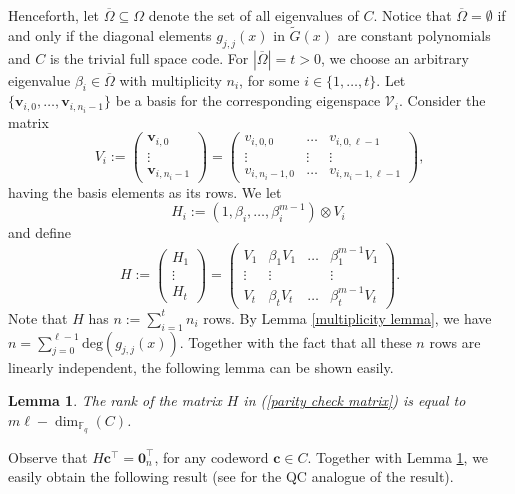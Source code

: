 \documentclass[11pt]{amsart}
\theoremstyle{plain}
\newtheorem{lem}[thm]{Lemma}
\theoremstyle{definition}
\numberwithin{equation}{section}
\newcommand{\Fq}{\mathbb{F}_{q}}
\begin{document}
Henceforth, let $\overline{\Omega}\subseteq \Omega$ denote the set of all eigenvalues of $C$. Notice that $\overline{\Omega}=\emptyset$ if and only if the diagonal elements $g_{j,j}(x)$ in $\widetilde{G}(x)$ are constant polynomials and $C$ is the trivial full space code. For $|\overline{\Omega}|=t>0$, we choose an arbitrary eigenvalue $\beta_i\in\overline{\Omega}$ with multiplicity $n_i$, for some $i \in\{1,\ldots,t\}$. Let $\{\mathbf{v}_{i,0},\ldots,\mathbf{v}_{i,n_i-1}\}$ be a basis for the corresponding eigenspace $\mathcal{V}_i$. Consider the matrix  
\begin{equation}\label{Eigenspace} 
V_i:=\begin{pmatrix}
\mathbf{v}_{i,0} \\
\vdots\\
\mathbf{v}_{i,n_i-1} 
 \end{pmatrix}=\begin{pmatrix}
v_{i,0,0}&\ldots&v_{i,0,\ell-1} \\
\vdots &\vdots & \vdots\\
v_{i,n_i-1,0}&\ldots&v_{i,n_i-1,\ell-1}
 \end{pmatrix},
\end{equation} 
having the basis elements as its rows. We let
\[ H_i:=(1, \beta_i,\ldots,\beta_i^{m-1})\otimes V_i\ \]
and define
\begin{equation}\label{parity check matrix} 
H:=\begin{pmatrix}
H_1 \\
\vdots\\
H_t 
\end{pmatrix}=\begin{pmatrix}
V_1&\beta_1V_1&\ldots&\beta_1^{m-1}V_1 \\
\vdots &\vdots & & \vdots\\
V_t&\beta_tV_t&\ldots&\beta_t^{m-1}V_t
\end{pmatrix}.
\end{equation} 
Note that $H$ has $n:=\sum_{i=1}^t n_i$ rows. By Lemma \ref{multiplicity lemma}, we have $n=\sum_{j=0}^{\ell-1}\mbox{deg}(g_{j,j}(x))$. Together with the fact that all these $n$ rows are linearly independent, the following lemma can be shown easily.
\begin{lem}\cite[Lemma 2]{ST}\label{rank lemma}
The rank of the matrix $H$ in (\ref{parity check matrix}) is equal to $m\ell -\dim_{\Fq}(C)$.
\end{lem}

Observe that $H \mathbf{c}^{\top}=\mathbf{0}_n^{\top}$, for any codeword $\mathbf{c}\in C$. Together with Lemma \ref{rank lemma}, we easily obtain the following result (see \cite[Theorem 1]{ST} for the QC analogue of the result).
\end{document}
